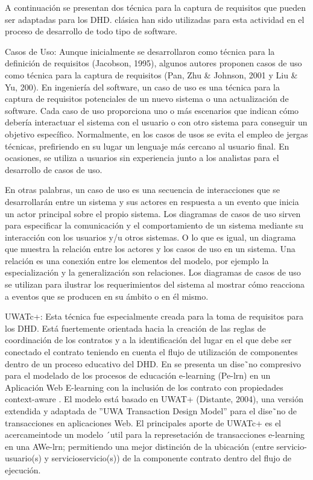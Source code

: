A continuación se presentan dos técnica para la captura de requisitos que
pueden ser adaptadas para los DHD.  clásica han sido
utilizadas para esta actividad en el proceso de desarrollo de todo tipo de
software.


\begin{descrition}
\item [Casos de Uso:] Aunque inicialmente se desarrollaron como técnica para la
definición de requisitos (Jacobson, 1995), algunos autores proponen casos de uso
como técnica para la captura de requisitos (Pan, Zhu & Johnson, 2001 y Liu &
Yu, 200). En ingeniería del software, un caso de uso  es una técnica para la
captura de requisitos potenciales de un nuevo sistema o una actualización de
software. Cada caso de uso proporciona uno o más escenarios que indican cómo
debería interactuar el sistema con el usuario o con otro sistema para conseguir
un objetivo específico. Normalmente, en los casos de usos se evita el empleo de
jergas técnicas, prefiriendo en su lugar un lenguaje más cercano al usuario
final. En ocasiones, se utiliza a usuarios sin experiencia junto a los analistas
para el desarrollo de casos de uso.

En otras palabras, un caso de uso es una secuencia de interacciones que se
desarrollarán entre un sistema y sus actores en respuesta a un evento que inicia
un actor principal sobre el propio sistema. Los diagramas de casos de uso sirven
para especificar la comunicación y el comportamiento de un sistema mediante su
interacción con los usuarios y/u otros sistemas. O lo que es igual, un diagrama
que muestra la relación entre los actores y los casos de uso en un sistema. Una
relación es una conexión entre los elementos del modelo, por ejemplo la
especialización y la generalización son relaciones. Los diagramas de casos de
uso se utilizan para ilustrar los requerimientos del sistema al mostrar cómo
reacciona a eventos que se producen en su ámbito o en él mismo.

\item [UWATc+:] Esta técnica fue especialmente creada para la toma de
requisitos para los DHD. Está fuertemente orientada hacia la
creación de las reglas de coordinación de los contratos y a la
identificación del lugar en el que debe ser conectado el contrato teniendo en
cuenta el flujo de utilización de componentes dentro de un proceso educativo
del DHD. En \cite{cacic2007} se presenta un dise˜no compresivo para el
modelado de los procesos de educación e-learning (Pe-lrn) en un Aplicación Web
E-learning con la inclusión de los contrato con propiedades context-aware
\cite{libro}. El modelo está basado en UWAT+ (Distante, 2004), una versión
extendida y adaptada de ”UWA Transaction Design Model” para el dise˜no de
transacciones en aplicaciones Web. El principales aporte de UWATc+ es
el acercameintode un modelo ´util para la represetación de transacciones
e-learning en una AWe-lrn; permitiendo una mejor distinción de la ubicación
(entre servicio-usuario(s) y servicioservicio(s)) de la componente contrato
dentro del flujo de ejecución. 


\end{descrition}
